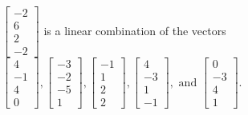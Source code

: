 \begin{exercise}
\begin{exerciseStatement}
  \end{exerciseStatement}
  \begin{exerciseAnswer}
   \(\left[\begin{array}{c}
-2 \\
6 \\
2 \\
-2
\end{array}\right]\) 
  	 is  
	a linear combination of the vectors \(\left[\begin{array}{c}
4 \\
-1 \\
4 \\
0
\end{array}\right] , \left[\begin{array}{c}
-3 \\
-2 \\
-5 \\
1
\end{array}\right] , \left[\begin{array}{c}
-1 \\
1 \\
2 \\
2
\end{array}\right] , \left[\begin{array}{c}
4 \\
-3 \\
1 \\
-1
\end{array}\right] , \text{ and } \left[\begin{array}{c}
0 \\
-3 \\
4 \\
1
\end{array}\right]\).

	
  


  \end{exerciseAnswer}
\end{exercise}